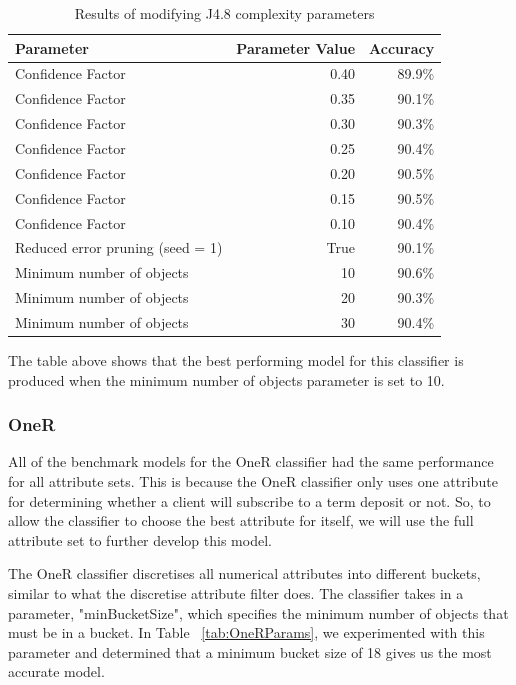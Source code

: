 \documentclass[a4paper,11pt]{article}
\begin{document}
\begin{table}[H]
  \begin{center}
    \begin{tabular}{l | r | r}
      Parameter & Parameter Value & Accuracy  \\ \hline
      Confidence Factor & 0.40 & 89.9\% \\
      Confidence Factor & 0.35 & 90.1\% \\
      Confidence Factor & 0.30 & 90.3\% \\
      Confidence Factor & 0.25 & 90.4\% \\
      Confidence Factor & 0.20 & 90.5\% \\
      Confidence Factor & 0.15 & 90.5\% \\
      Confidence Factor & 0.10 & 90.4\% \\
      Reduced error pruning (seed = 1) & True & 90.1\% \\
      Minimum number of objects  & 10 & 90.6\% \\
      Minimum number of objects  & 20 & 90.3\% \\
      Minimum number of objects  & 30 & 90.4\% \\
    \end{tabular}
  \end{center}
  \caption{Results of modifying J4.8 complexity parameters}
  \label{tab:J48Params}
\end{table}

The table above shows that the best performing model for this classifier is produced when the minimum number of objects
parameter is set to 10.

\subsubsection{OneR}

All of the benchmark models for the OneR classifier had the same performance for all attribute sets. This
is because the OneR classifier only uses one attribute for determining whether a client will subscribe to a term deposit
or not. So, to allow the classifier to choose the best attribute for itself, we will use the full attribute set to
further develop this model.

The OneR classifier discretises all numerical attributes into different buckets, similar to what the discretise 
attribute filter does. The classifier takes in a parameter, "minBucketSize", which specifies the minimum number of objects 
that must be in a bucket. In Table ~\ref{tab:OneRParams}, we experimented with this parameter and determined that a minimum
bucket size of 18 gives us the most accurate model.
\end{document}
